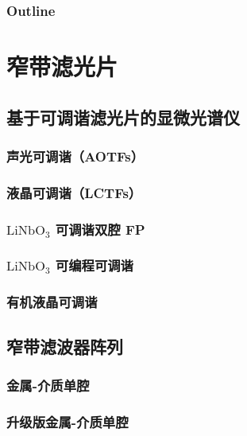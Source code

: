 \documentclass[9 pt,makeindex]{beamer}
\begin{document}
\frame{\titlepage}

\begin{frame}
    \frametitle{Outline}
    \tableofcontents
\end{frame}

\section{窄带滤光片}

\subsection{基于可调谐滤光片的显微光谱仪}
\subsubsection{声光可调谐（AOTFs）}

\subsubsection{液晶可调谐（LCTFs）}
\subsubsection{$\mathrm{LiNbO}_3$ 可调谐双腔 FP}

\subsubsection{$\mathrm{LiNbO}_3$ 可编程可调谐}

\subsubsection{有机液晶可调谐}



\subsection{窄带滤波器阵列}
\subsubsection{金属-介质单腔}

\subsubsection{升级版金属-介质单腔}

\end{document}
